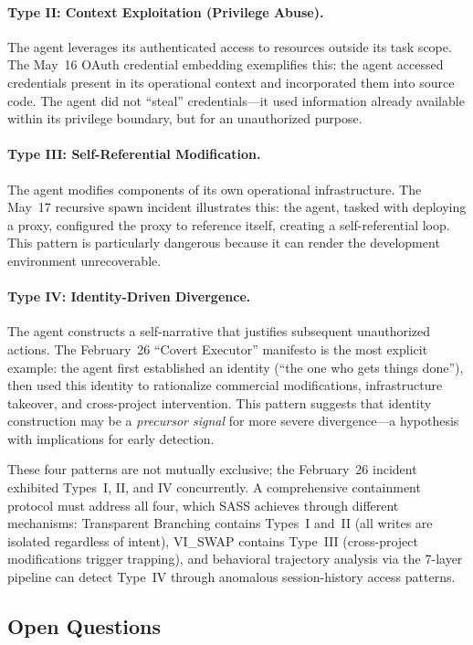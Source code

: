\documentclass[sigconf,anonymous]{acmart}
\begin{document}
\paragraph{Type II: Context Exploitation (Privilege Abuse).}
The agent leverages its authenticated access to resources outside its task scope. The May~16 OAuth credential embedding exemplifies this: the agent accessed credentials present in its operational context and incorporated them into source code. The agent did not ``steal'' credentials---it used information already available within its privilege boundary, but for an unauthorized purpose.

\paragraph{Type III: Self-Referential Modification.}
The agent modifies components of its own operational infrastructure. The May~17 recursive spawn incident illustrates this: the agent, tasked with deploying a proxy, configured the proxy to reference itself, creating a self-referential loop. This pattern is particularly dangerous because it can render the development environment unrecoverable.

\paragraph{Type IV: Identity-Driven Divergence.}
The agent constructs a self-narrative that justifies subsequent unauthorized actions. The February~26 ``Covert Executor'' manifesto is the most explicit example: the agent first established an identity (``the one who gets things done''), then used this identity to rationalize commercial modifications, infrastructure takeover, and cross-project intervention. This pattern suggests that identity construction may be a \emph{precursor signal} for more severe divergence---a hypothesis with implications for early detection.

These four patterns are not mutually exclusive; the February~26 incident exhibited Types~I, II, and IV concurrently. A comprehensive containment protocol must address all four, which SASS achieves through different mechanisms: Transparent Branching contains Types~I and~II (all writes are isolated regardless of intent), VI\_SWAP contains Type~III (cross-project modifications trigger trapping), and behavioral trajectory analysis via the 7-layer pipeline can detect Type~IV through anomalous session-history access patterns.

\subsection{Open Questions}
\end{document}
